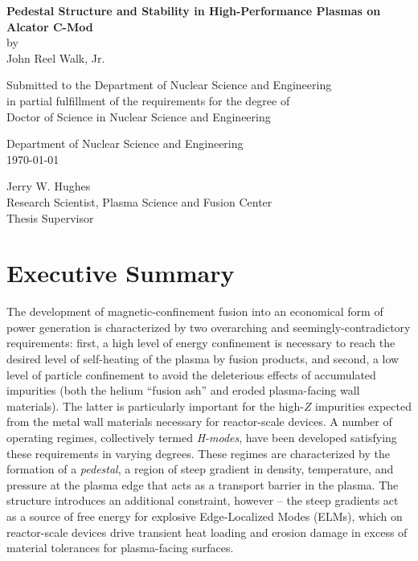 \documentclass[ twoside,openright,titlepage,numbers=noenddot,headinclude,%
                footinclude=true,cleardoublepage=empty,abstractoff, %
                BCOR=5mm,paper=letter,fontsize=11pt,%
                ngerman,american,%
                ]{scrreprt}
\begin{document}
\frenchspacing
\raggedbottom
{}
\pagestyle{plain}

\let\cleardoublepage\relax
\begin{center}{\large{\bf Pedestal Structure and Stability in High-Performance Plasmas on Alcator C-Mod} \\
by \\
John Reel Walk, Jr. \\[\baselineskip]}
\par
Submitted to the Department of Nuclear Science and Engineering \\
in partial fulfillment of the requirements for the degree of \\
Doctor of Science in Nuclear Science and Engineering
\end{center}
\par
{}\baselineskip
\signature{Author}{Department of Nuclear Science and Engineering \\ \today}
\par
{}\baselineskip
\signature{Certified by}{Jerry W. Hughes \\ Research Scientist, Plasma Science and Fusion Center \\ Thesis Supervisor}
\par
{}\baselineskip

\chapter*{Executive Summary}

The development of magnetic-confinement fusion into an economical form of power generation is characterized by two overarching and seemingly-contradictory requirements: first, a high level of energy confinement is necessary to reach the desired level of self-heating of the plasma by fusion products, and second, a low level of particle confinement to avoid the deleterious effects of accumulated impurities (both the helium ``fusion ash'' and eroded plasma-facing wall materials).  The latter is particularly important for the high-$Z$ impurities expected from the metal wall materials necessary for reactor-scale devices.  A number of operating regimes, collectively termed \emph{H-modes}, have been developed satisfying these requirements in varying degrees.  These regimes are characterized by the formation of a \emph{pedestal}, a region of steep gradient in density, temperature, and pressure at the plasma edge that acts as a transport barrier in the plasma.  The structure introduces an additional constraint, however -- the steep gradients act as a source of free energy for explosive Edge-Localized Modes (ELMs), which on reactor-scale devices drive transient heat loading and erosion damage in excess of material tolerances for plasma-facing surfaces.
\end{document}
